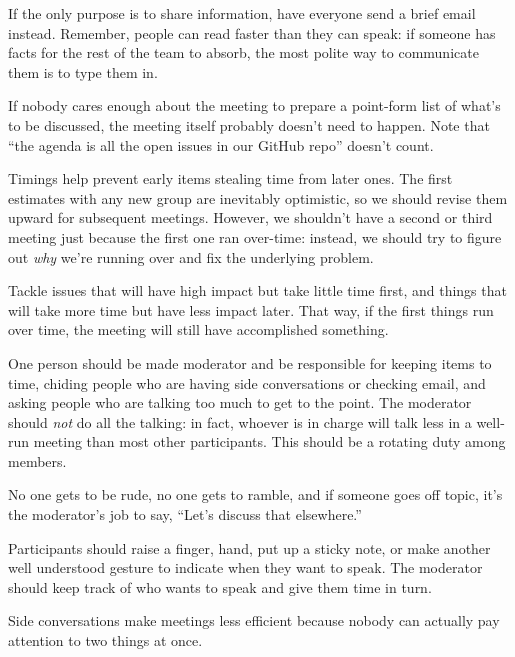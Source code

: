 \documentclass[
]{krantz}
\providecommand{\tightlist}{%
  \setlength{\itemsep}{0pt}\setlength{\parskip}{0pt}}
\begin{document}
\begin{description}
\tightlist
\item[Decide if there actually needs to be a meeting.]
If the only purpose is to share information,
have everyone send a brief email instead.
Remember, people can read faster than they can speak:
if someone has facts for the rest of the team to absorb,
the most polite way to communicate them is to type them in.
\item[Write an agenda.]
If nobody cares enough about the meeting to prepare a point-form list of what's to be discussed,
the meeting itself probably doesn't need to happen.
Note that ``the agenda is all the open issues in our GitHub repo'' doesn't count.
\item[Include timings in the agenda.]
Timings help prevent early items stealing time from later ones.
The first estimates with any new group are inevitably optimistic,
so we should revise them upward for subsequent meetings.
However,
we shouldn't have a second or third meeting just because the first one ran over-time:
instead, we should try to figure out \emph{why} we're running over and fix the underlying problem.
\item[Prioritize.]
Tackle issues that will have high impact but take little time first,
and things that will take more time but have less impact later.
That way, if the first things run over time,
the meeting will still have accomplished something.
\item[Make one person responsible for keeping things moving.]
One person should be made moderator
and be responsible for keeping items to time,
chiding people who are having side conversations or checking email,
and asking people who are talking too much to get to the point.
The moderator should \emph{not} do all the talking:
in fact,
whoever is in charge will talk less in a well-run meeting than most other participants.
This should be a rotating duty among members.
\item[Require politeness.]
No one gets to be rude,
no one gets to ramble,
and if someone goes off topic,
it's the moderator's job to say,
``Let's discuss that elsewhere.''
\item[No interruptions.]
Participants should raise a finger, hand,
put up a sticky note,
or make another well understood gesture to indicate
when they want to speak.
The moderator should keep track of who wants to speak and give them time in turn.
\item[No distractions.]
Side conversations make meetings less efficient because
nobody can actually pay attention to two things at once.

\end{description}
\end{document}
